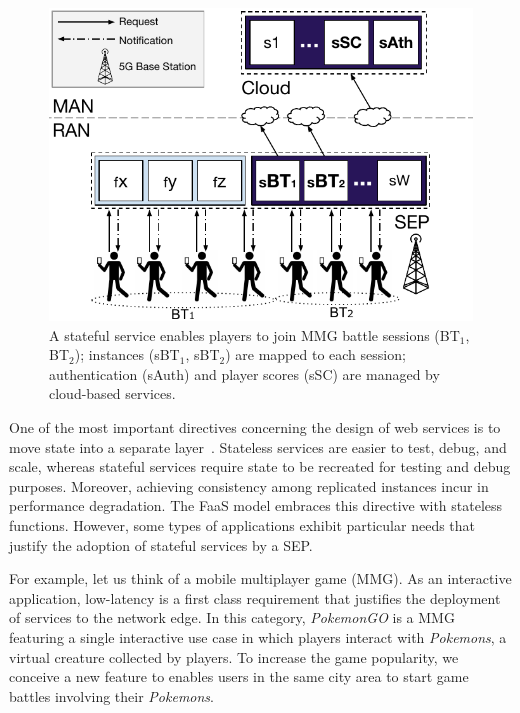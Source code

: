 \begin{figure}[bp]
	\centering
	\includegraphics[width=1\linewidth]{Figs/Stateful_Edge_Services_MMG.pdf}
	\caption{A stateful service enables players to join MMG battle sessions (BT$_1$, BT$_2$); instances (sBT$_1$, sBT$_2$) are mapped to each session; authentication (sAuth) and player scores (sSC) are managed by cloud-based services.}
	\label{fig:Steteful_Edge_MMG}
\end{figure}

One of the most important directives concerning the design of web services is to move state into a separate layer~\cite{Armbrust:2010}. Stateless services are easier to test, debug, and scale, whereas stateful services require state to be recreated for testing and debug purposes. Moreover, achieving consistency among replicated instances incur in performance degradation. 
The FaaS model embraces this directive with stateless functions.
However, some types of applications exhibit particular needs that justify the adoption of stateful services by a SEP.

For example, let us think of a mobile multiplayer game (MMG). As an interactive application, low-latency is a first class requirement that justifies the deployment of services to the network edge. In this category, \textit{PokemonGO} is 
a MMG featuring a single interactive use case in which players interact with \textit{Pokemons}, a virtual creature collected by players.
To increase the game popularity, we conceive a new feature to enables users in the same city area to start game battles involving their \textit{Pokemons}. 

